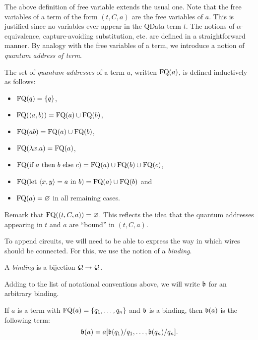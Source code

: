 \documentclass[twoside]{article}
\begin{document}
The above definition of free variable extends the usual one. Note 
that the free variables of a term of the form $(t,C,a)$ are the 
free variables of $a$. This is justified since no variables ever 
appear in the QData term $t$. The notions of $\alpha$-equivalence, 
capture-avoiding substitution, etc. are defined in a straightforward 
manner. By analogy with the free variables of a term, we introduce a 
notion of \emph{quantum address of term}.

\begin{definition}
The set of \emph{quantum addresses} of a term $a$, written $\mathop{\textrm{FQ}}\nolimits(a)$, is 
defined inductively as follows:
\begin{itemize}
  \item $\mathop{\textrm{FQ}}\nolimits(q)=\{q\}$,
  \item $\mathop{\textrm{FQ}}\nolimits(\langle a,b\rangle)=\mathop{\textrm{FQ}}\nolimits(a)\cup \mathop{\textrm{FQ}}\nolimits(b)$,
  \item $\mathop{\textrm{FQ}}\nolimits(ab)=\mathop{\textrm{FQ}}\nolimits(a)\cup \mathop{\textrm{FQ}}\nolimits(b)$,
  \item $\mathop{\textrm{FQ}}\nolimits(\lambda x.a)=\mathop{\textrm{FQ}}\nolimits(a)$,
  \item $\mathop{\textrm{FQ}}\nolimits(\text{if}~ a ~\text{then}~ b ~\text{else}~ c) = \mathop{\textrm{FQ}}\nolimits(a) \cup \mathop{\textrm{FQ}}\nolimits(b) \cup \mathop{\textrm{FQ}}\nolimits(c)$,
  \item $\mathop{\textrm{FQ}}\nolimits(\text{let}~ \langle x,y\rangle = a ~\text{in}~ b)= \mathop{\textrm{FQ}}\nolimits(a)\cup \mathop{\textrm{FQ}}\nolimits(b)$ and
  \item $\mathop{\textrm{FQ}}\nolimits(a)=\varnothing$ in all remaining cases.
\end{itemize}
\end{definition}

Remark that $\mathop{\textrm{FQ}}\nolimits((t,C,a))=\varnothing$. This reflects the idea that the 
quantum addresses appearing in $t$ and $a$ are ``bound'' in $(t,C,a)$. 

To append circuits, we will need to be able to express the way in 
which wires should be connected. For this, we use the notion of a 
\emph{binding}.

\begin{definition}
A \emph{binding} is a bijection $\mathcal{Q}\to \mathcal{Q}$.
\end{definition}


Adding to the list of notational conventions above, we will write 
$\mathfrak{b}$ for an arbitrary binding. 

\begin{definition}
If $a$ is a term with $\mathop{\textrm{FQ}}\nolimits(a)=\{q_1,\ldots,q_n\}$ and $\mathfrak{b}$ is 
a binding, then $\mathfrak{b}(a)$ is the following term:
\[
\mathfrak{b}(a)= a[\mathfrak{b}(q_1)/q_1,\ldots ,\mathfrak{b}(q_n)/q_n].
\]
\end{definition}
\end{document}
